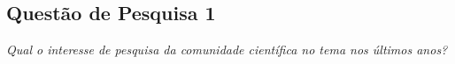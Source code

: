 
\subsection{Quest\~{a}o de Pesquisa 1}
\emph{Qual o interesse de pesquisa da comunidade científica no tema nos \'{u}ltimos anos?}

